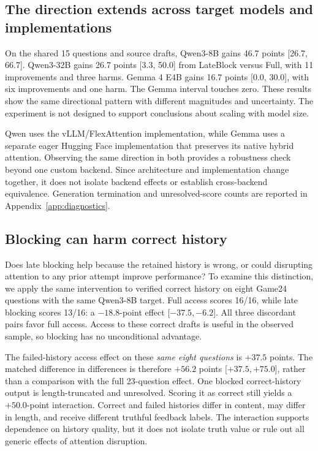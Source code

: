 \documentclass{article}
\newcommand{\fullaccess}{\ifmmode\mathrm{Full}\else\textup{Full}\fi}
\newcommand{\lateblock}{\ifmmode\mathrm{LateBlock}\else\textup{LateBlock}\fi}
\begin{document}
\subsection{The direction extends across target models and implementations}
\label{sec:target-models}

On the shared 15 questions and source drafts, Qwen3-8B gains 46.7 points [26.7, 66.7]. Qwen3-32B gains 26.7 points [3.3, 50.0] from \lateblock{} versus \fullaccess{}, with 11 improvements and three harms. Gemma 4 E4B gains 16.7 points [0.0, 30.0], with six improvements and one harm. The Gemma interval touches zero. These results show the same directional pattern with different magnitudes and uncertainty. The experiment is not designed to support conclusions about scaling with model size.

Qwen uses the vLLM/FlexAttention implementation, while Gemma uses a separate eager Hugging Face implementation that preserves its native hybrid attention. Observing the same direction in both provides a robustness check beyond one custom backend. Since architecture and implementation change together, it does not isolate backend effects or establish cross-backend equivalence. Generation termination and unresolved-score counts are reported in Appendix~\ref{app:diagnostics}.

\subsection{Blocking can harm correct history}
\label{sec:specificity}

Does late blocking help because the retained history is wrong, or could disrupting attention to any prior attempt improve performance? To examine this distinction, we apply the same intervention to verified correct history on eight Game24 questions with the same Qwen3-8B target. Full access scores 16/16, while late blocking scores 13/16: a $-18.8$-point effect [${-37.5},{-6.2}$]. All three discordant pairs favor full access. Access to these correct drafts is useful in the observed sample, so blocking has no unconditional advantage.

The failed-history access effect on these \emph{same eight questions} is $+37.5$ points. The matched difference in differences is therefore $+56.2$ points [${+37.5},{+75.0}$], rather than a comparison with the full 23-question effect. One blocked correct-history output is length-truncated and unresolved. Scoring it as correct still yields a $+50.0$-point interaction. Correct and failed histories differ in content, may differ in length, and receive different truthful feedback labels. The interaction supports dependence on history quality, but it does not isolate truth value or rule out all generic effects of attention disruption.
\end{document}
